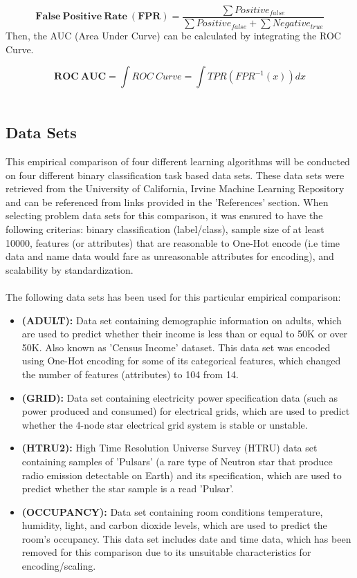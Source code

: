\documentclass[twoside,11pt]{article}
\begin{document}
\[ \mathbf{False\ Positive\ Rate\ (FPR)}=\frac{\sum Positive_{false}}{\sum Positive_{false}+\sum Negative_{true}}\]
Then, the AUC (Area Under Curve) can be calculated by integrating the ROC Curve. 

\[ \mathbf{ROC\ AUC}=\int ROC\ Curve = \int TPR(FPR^{-1}(x))dx\]\\

\subsection{Data Sets}

This empirical comparison of four different learning algorithms will be 
conducted on four different binary classification task based data sets. 
These data sets were retrieved from the University of California, Irvine 
Machine Learning Repository and can be referenced from links provided in 
the 'References' section. When selecting problem data sets for this comparison, 
it was ensured to have the following criterias: binary classification (label/class), 
sample size of at least 10000, features (or attributes) that are reasonable to 
One-Hot encode (i.e time data and name data would fare as unreasonable 
attributes for encoding), and scalability by standardization.\\
\\
The following data sets has been used for this particular empirical comparison: 
    \begin{itemize}
        \item \textbf{(ADULT):} Data set containing demographic information on adults, 
        which are used to predict whether their income is less than or equal to 50K or 
        over 50K. Also known as 'Census Income' dataset. This data set was encoded using 
        One-Hot encoding for some of its categorical features, which changed the number 
        of features (attributes) to 104 from 14.
        \item \textbf{(GRID):} Data set containing electricity power specification data 
        (such as power produced and consumed) for electrical grids, which are used to 
        predict whether the 4-node star electrical grid system is stable or unstable.
        \item \textbf{(HTRU2):} High Time Resolution Universe Survey (HTRU) data set 
        containing samples of 'Pulsars' (a rare type of Neutron star that produce radio 
        emission detectable on Earth) and its specification, which are used to predict 
        whether the star sample is a read 'Pulsar'.
        \item \textbf{(OCCUPANCY):} Data set containing room conditions  temperature, 
        humidity, light, and carbon dioxide levels, which are used to predict the room's 
        occupancy. This data set includes date and time data, which has been removed for 
        this comparison due to its unsuitable characteristics for encoding/scaling.
    \end{itemize}
    
\end{document}
